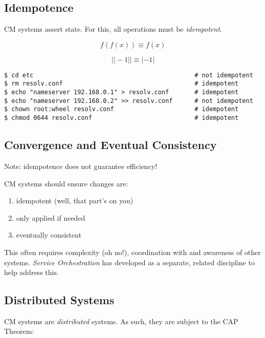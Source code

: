 \documentclass[xga]{xdvislides}
\begin{document}
\subsection{Idempotence}
CM systems assert state.  For this, all operations
must be {\em idempotent}. \\
\vspace{.5in}

\begin{displaymath}
f(f(x)) \equiv f(x)
\end{displaymath}

\begin{displaymath}
| |-1| | \equiv |-1|
\end{displaymath}

\begin{verbatim}
$ cd etc                                            # not idempotent
$ rm resolv.conf                                    # idempotent
$ echo "nameserver 192.168.0.1" > resolv.conf       # idempotent
$ echo "nameserver 192.168.0.2" >> resolv.conf      # not idempotent
$ chown root:wheel resolv.conf                      # idempotent
$ chmod 0644 resolv.conf                            # idempotent
\end{verbatim}

\subsection{Convergence and Eventual Consistency}
Note: idempotence does not guarantee efficiency! \\
\vspace{.5in}

CM systems should ensure changes are:
\begin{enumerate}
	\item idempotent (well, that part's on you)
	\item only applied if needed
	\item eventually consistent
\end{enumerate}
\vspace{.5in}

This often requires complexity (oh no!), coordination
with and awareness of other systems.  {\em Service
Orchestration} has developed as a separate, related
discipline to help address this.

\subsection{Distributed Systems}
CM systems are {\em distributed} systems.  As such,
they are subject to the CAP Theorem: \\
\end{document}
